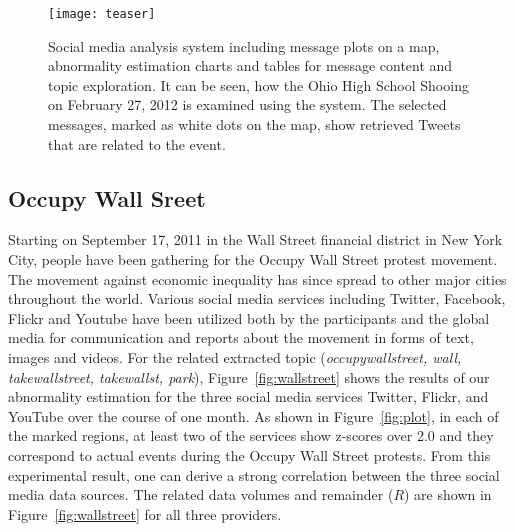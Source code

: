 \begin{figure}[tb]
\texttt{[image: teaser]}
\caption{Social media analysis system including message plots on a map, abnormality estimation charts and tables for message content and topic exploration. 
  It can be seen, how the Ohio High School Shooing on February 27, 2012 is examined using the system. The selected messages, marked as white dots on the map, show retrieved Tweets that are related to the event.}
\label{fig:system}
\end{figure}





\subsection{Occupy Wall Sreet}
\label{subsec:occupy_wallst}

Starting on September 17, 2011 in the Wall Street financial district in New York City,
people have been gathering for the Occupy Wall Street protest movement.
The movement against economic inequality has since spread to other major cities throughout the world.
Various social media services including Twitter, Facebook, Flickr and Youtube have been utilized both by the participants and the global media for communication and reports about the movement in forms of text, images and videos. 
For the related extracted topic (\textit{occupywallstreet, wall, takewallstreet, takewallst, park}), 
Figure~\ref{fig:wallstreet} shows the results of our abnormality estimation for the three social media services Twitter, Flickr, and YouTube over the course of one month.
As shown in Figure~\ref{fig:plot}, in each of the marked regions, at least two of the services show z-scores over 2.0 and they correspond to actual events during the Occupy Wall Street protests.
From this experimental result, one can derive a strong correlation between the three social media data sources.
The related data volumes and remainder ($R$) are shown in Figure~\ref{fig:wallstreet} for all three providers.

